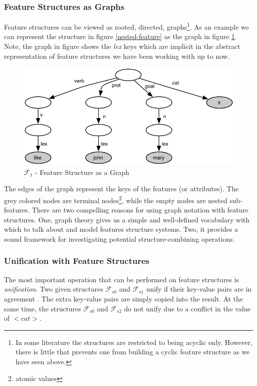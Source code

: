\documentclass[12pt]{article}
\begin{document}
\subsubsection{Feature Structures as Graphs}
Feature structures can be viewed as rooted, directed, graphs\footnote{
In some literature the structures are restricted to being acyclic only. However, 
there is little that prevents one from building a cyclic feature structure as
we have seen above.}. As an example we can represent the structure in figure
\ref{nested-feature} as the graph in figure \ref{nested-figure-graph}.
Note, the graph in figure shows the \textit{lex} keys which are 
implicit in the abstract representation of feature structures we 
have been working with up to now.

\begin{figure}[h!]
    \centering
    \includegraphics[scale=0.75]{fsgraph}
    \caption{$\mathcal{F}_{1}$ - Feature Structure as a Graph}
    \label{nested-figure-graph}
\end{figure}

The edges of the graph represent the keys of the features (or attributes). The grey colored
nodes are terminal nodes\footnote{atomic values}, while the empty nodes 
are nested sub-features. There are two compelling reasons for using graph notation
with feature structures. One, graph theory gives us a simple and well-defined
vocabulary with which to talk about and model features structure systems. Two,
it provides a sound framework for investigating potential structure-combining
operations.

\subsubsection{Unification with Feature Structures}
The most important operation that can be performed on feature structures
is \textit{unification}. Two given structures $\mathcal{F}_{s0}$ and 
$\mathcal{F}_{s1}$ unify if their key-value pairs are in agreement \cite{johnson-avl}.  The extra key-value
pairs are simply copied into the result. At the same time, the structures
$\mathcal{F}_{s0}$ and $\mathcal{F}_{s2}$ do not unify due to a conflict in the value of $<cat>$.
\end{document}

